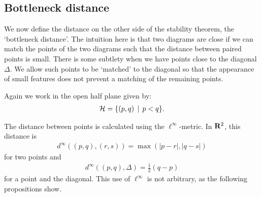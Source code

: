 \subsection{Bottleneck distance}

We now define the distance on the other side of the stability theorem, the `bottleneck distance'. The intuition here is that two diagrams are close if we can match the points of the two diagrams such that the distance between paired points is small. There is some subtlety when we have points close to the diagonal $\Delta$. We allow such points to be `matched' to the diagonal so that the appearance of small features does not prevent a matching of the remaining points.

Again we work in the open half plane given by:
\begin{align*}
\mathcal{H} = \{(p, q) \, \mid \, p < q \}.
\end{align*}

The distance between points is calculated using the $\ell^\infty$-metric. In $\mathbf{R}^2$, this distance is
\begin{align*}
d^\infty((p, q), (r, s)) = \max(|p - r|, |q - s|)
\end{align*}
for two points and
\begin{align*}
d^\infty((p, q), \Delta) = \tfrac{1}{2} (q - p)
\end{align*}
for a point and the diagonal. This use of $\ell^\infty$ is not arbitrary, as the following propositions show.

